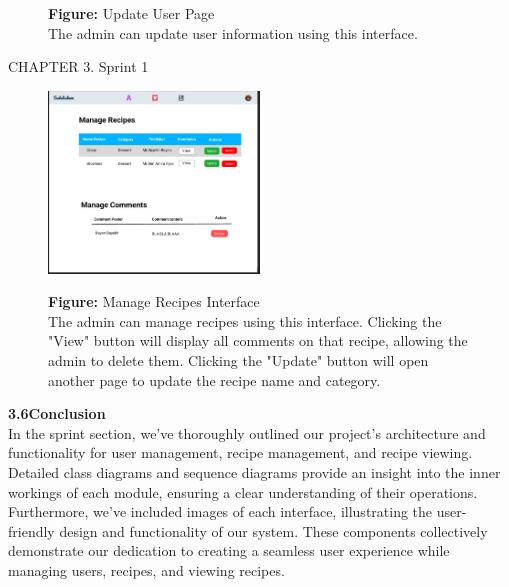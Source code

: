 \documentclass{article}
\begin{document}
{{{{{{{{\begin{figure}[htbp]
    \textbf{Figure:} Update User Page \\
    The admin can update user information using this interface.
\end{figure}
\newpage
\noindent
CHAPTER 3.  Sprint 1 \\
\underline{\hspace{\textwidth}} \vspace{0.2cm}
\begin{figure}[htbp]
    \centering
    \includegraphics[width=0.5\textwidth]{ManageRecipes} 
    \vspace{0.5cm}
    
    \textbf{Figure:} Manage Recipes Interface \\
    The admin can manage recipes using this interface. Clicking the "View" button will display all comments on that recipe, allowing the admin to delete them. Clicking the "Update" button will open another page to update the recipe name and category.
\end{figure}













{\Large \textbf{3.6\hspace{1em}Conclusion}}\vspace{0.2cm}\\
In the sprint section, we've thoroughly outlined our project's architecture and functionality for user management, recipe management, and recipe viewing. Detailed class diagrams and sequence diagrams provide an insight into the inner workings of each module, ensuring a clear understanding of their operations. Furthermore, we've included images of each interface, illustrating the user-friendly design and functionality of our system. These components collectively demonstrate our dedication to creating a seamless user experience while managing users, recipes, and viewing recipes.
\newpage
}}}}}}}}
\end{document}
